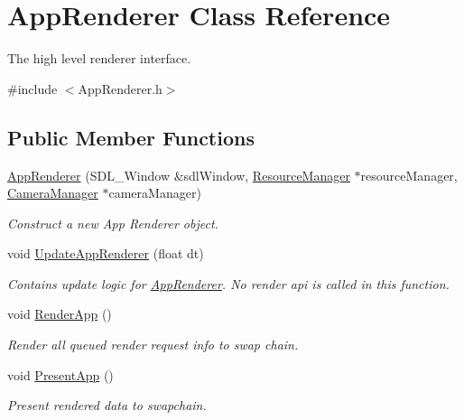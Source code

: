 \hypertarget{classAppRenderer}{}\section{App\+Renderer Class Reference}
\label{classAppRenderer}


The high level renderer interface.  




{\ttfamily \#include $<$App\+Renderer.\+h$>$}

\subsection*{Public Member Functions}
\begin{DoxyCompactItemize}
\item 
\hyperlink{classAppRenderer_a01b9e6fe7b454466ea00c81d0eb8a89c}{App\+Renderer} (S\+D\+L\+\_\+\+Window \&sdl\+Window, \hyperlink{classResourceManager}{Resource\+Manager} $\ast$resource\+Manager, \hyperlink{classCameraManager}{Camera\+Manager} $\ast$camera\+Manager)
\begin{DoxyCompactList}\small\item\em Construct a new App Renderer object. \end{DoxyCompactList}\item 
void \hyperlink{classAppRenderer_afef47670f4584e2caa6fa750aacd089e}{Update\+App\+Renderer} (float dt)
\begin{DoxyCompactList}\small\item\em Contains update logic for \hyperlink{classAppRenderer}{App\+Renderer}. No render api is called in this function. \end{DoxyCompactList}\item 
\mbox{\label{classAppRenderer_a2a094187727c735aeb1ca376f4d02f29}} 
void \hyperlink{classAppRenderer_a2a094187727c735aeb1ca376f4d02f29}{Render\+App} ()
\begin{DoxyCompactList}\small\item\em Render all queued render request info to swap chain. \end{DoxyCompactList}\item 
\mbox{\label{classAppRenderer_a393b3c6f865bc07612f26e185100ca6a}} 
void \hyperlink{classAppRenderer_a393b3c6f865bc07612f26e185100ca6a}{Present\+App} ()
\begin{DoxyCompactList}\small\item\em Present rendered data to swapchain. \end{DoxyCompactList}\item 

\end{DoxyCompactItemize}
